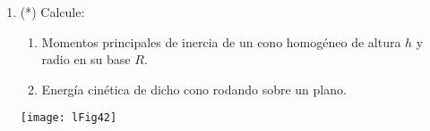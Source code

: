 \documentclass[11pt, spanish, a4paper, twopage]{article}
\begin{document}
\begin{enumerate}
\item 
\begin{minipage}[t][3.5cm]{0.5\textwidth}
(*) Calcule:
	\begin{enumerate}
		\item Momentos principales de inercia de un cono homogéneo de altura \(h\) y radio en su base \(R\).
		\item Energía cinética de dicho cono rodando sobre un plano.
	\end{enumerate}
\end{minipage}
\begin{minipage}[c][1cm][t]{0.45\textwidth}
	\texttt{[image: lFig42]}
\end{minipage}




\end{enumerate}
\end{document}
